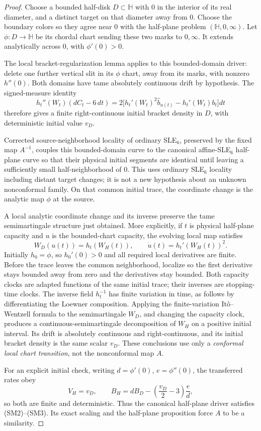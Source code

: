 \documentclass[11pt]{article}
\theoremstyle{definition}\newtheorem{definition}[theorem]{Definition}
\theoremstyle{remark}\newtheorem{remark}[theorem]{Remark}
\begin{document}
\begin{proof}
Choose a bounded half-disk $D\subset\mathbb H$ with $0$ in the interior of
its real diameter, and a distinct target on that diameter away from $0$.
Choose the boundary colors so they agree near $0$ with the half-plane
problem $(\mathbb H,0,\infty)$.  Let $\phi:D\to\mathbb H$ be its chordal
chart sending these two marks to $0,\infty$.  It extends analytically
across $0$, with $\phi'(0)>0$.

The local bracket-regularization lemma applies to this bounded-domain
driver: delete one further vertical slit in its $\phi$ chart, away from its
marks, with nonzero $h''(0)$.  Both domains have tame absolutely continuous
drift by hypothesis.  The signed-measure identity
\[
 h_t''(W_t)(dC_t-6\,dt)
  =2\bigl[h_t'(W_t)^2\widehat b_{u(t)}
                        -h_t'(W_t)b_t\bigr]dt
\]
therefore gives a finite right-continuous initial bracket density in $D$,
with deterministic initial value $v_D$.

Corrected source-neighborhood locality of ordinary SLE$_6$, preserved by
the fixed map $A^{-1}$, couples this bounded-domain curve to the canonical
affine-SLE$_6$ half-plane curve so that their physical initial segments are
identical until leaving a sufficiently small half-neighborhood of $0$.
This uses ordinary SLE$_6$ locality including distant target changes; it is
not a new hypothesis about an unknown nonconformal family.
On that common initial trace, the coordinate change is the analytic map
$\phi$ at the source.

A local analytic coordinate change and its inverse preserve the tame
semimartingale structure just obtained.  More explicitly, if $t$ is physical
half-plane capacity and $u$ is the bounded-chart capacity, the evolving local
map satisfies
\[
 W_D(u(t))=h_t(W_H(t)),\qquad
 \dot u(t)=h_t'(W_H(t))^2.
\]
Initially $h_0=\phi$, so $h_0'(0)>0$ and all required local derivatives are
finite.  Before the trace leaves the common neighborhood, localize so the
first derivative stays bounded away from zero and the derivatives stay
bounded.  Both capacity clocks are adapted functions of the same initial
trace; their inverses are stopping-time clocks.  The inverse field
$h_t^{-1}$ has finite variation in time, as follows by differentiating the
Loewner composition.  Applying the finite-variation It\^o--Wentzell formula
to the semimartingale $W_D$, and changing the capacity clock, produces a
continuous-semimartingale decomposition of $W_H$ on a positive initial
interval.  Its drift is absolutely continuous and right-continuous, and its
initial bracket density is the same scalar $v_D$.  These conclusions use
only a \emph{conformal local chart transition}, not the nonconformal map $A$.

For an explicit initial check, writing $d=\phi'(0)$, $e=\phi''(0)$,
the transferred rates obey
\[
 V_H=v_D,\qquad
 B_H=dB_D-\left(\frac{v_D}{2}-3\right)\frac ed,
 \tag{SM6}
\]
so both are finite and deterministic.  Thus the canonical half-plane driver
satisfies (SM2)--(SM3).  Its exact scaling and the half-plane proposition
force $A$ to be a similarity.
\end{proof}
\end{document}
